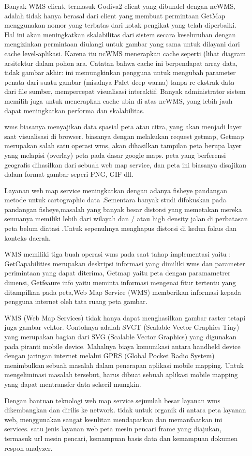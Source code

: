 Banyak WMS client, termasuk Godiva2 client yang dibundel dengan ncWMS, adalah tidak hanya berasal dari client yang membuat permintaan
GetMap menggunakan nomor yang terbatas dari kotak pengikat yang telah diperbaiki. Hal ini akan meningkatkan skalabilitas dari sistem
secara keseluruhan dengan mengizinkan permintaan diulangi untuk gambar yang sama untuk dilayani dari cache level-aplikasi. Karena itu
ncWMS menerapkan cache seperti (lihat diagram arsitektur dalam pohon ara.  Catatan bahwa cache ini berpendapat array data, tidak gambar
akhir: ini memungkinkan pengguna untuk mengubah parameter penata dari suatu gambar (misalnya Palet deep warna) tanpa re-ekstrak data
dari file sumber, mempercepat visualisasi interaktif. Banyak administrator sistem memilih juga untuk menerapkan cache ubin di atas
ncWMS, yang lebih jauh dapat meningkatkan performa dan skalabilitas.

wms biasanya menyajikan data spasial peta atau citra, yang akan menjadi layer saat visualisasi di browser.
biasanya dengan melakukan request getmap, Getmap merupakan salah satu operasi wms, akan dihasilkan tampilan peta berupa layer yang
melapisi (overlay) peta pada dasar google maps. peta yang berferensi geografis dihasilkan dari sebuah web map service, dan peta ini
biasanya disajikan dalam format gambar seperi PNG, GIF dll.

Layanan web map service  meningkatkan dengan  adanya fisheye pandangan metode untuk cartographic data .Sementara banyak studi difokuskan
pada pandangan fisheye,masalah yang banyak besar distorsi yang memetakan mereka semuanya memiliki lebih dari wilayah dan / atau high
density jalan di perbatasan peta belum diatasi .Untuk sepenuhnya menghapus distorsi di kedua fokus dan konteks daerah.

WMS memiliki tiga buah operasi wms pada saat tahap implementasi yaitu : GetCapabilities merupakan deskripsi informasi yang dimiliki wms
dan parameter perimintaan yang dapat diterima, Getmap yaitu peta dengan paramametrer dimensi, Getfeaure info yaitu meminta informasi 
mengenai fitur tertentu yang ditampilkan pada peta,Web Map Service (WMS) memberikan informasi kepada pengguna internet oleh tata ruang peta gambar.

WMS (Web Map Services) tidak hanya dapat menghasilkan gambar raster tetapi juga gambar vektor. Contohnya  adalah SVGT (Scalable Vector
Graphics Tiny) yang merupakan bagian dari SVG (Scalable Vector Graphics) yang digunakan pada piranti mobile device. Mahalnya biaya
komunikasi antara handheld device dengan jaringan internet melalui GPRS (Global Pocket Radio System) menimbulkan sebuah masalah dalam
penerapan aplikasi mobile mapping. Untuk mengeliminasi masalah tersebut, harus dibuat sebuah aplikasi mobile mapping yang dapat mentransfer data sekecil mungkin.

Dengan bantuan teknologi web map service  sejumlah besar layanan wms dikembangkan dan dirilis ke network. tidak untuk organik di antara
peta layanan web, menggunakan sangat kesulitan mendapatkan dan memanfaatkan ini services. satu jenis layanan web peta mesin pencari
frame yang diajukan, termasuk url mesin pencari, kemampuan basis data dan kemampuan dokumen respon analyzer.
  
  

